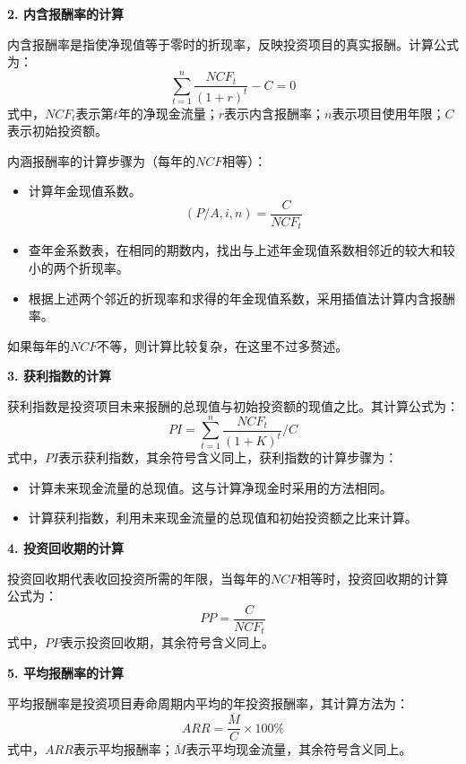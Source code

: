 \documentclass[
  10pt,
  twoside,
  openany,
  b5paper, %
  colorscheme = black, %
  xits = false,
]{qyxf-book}
\begin{document}
\textbf{2. 内含报酬率的计算}

内含报酬率是指使净现值等于零时的折现率，反映投资项目的真实报酬。计算公式为：
\begin{equation*}
	\sum_{t=1}^{n} \frac{NCF_t}{(1+r)^t}-C =0
\end{equation*}
式中，$NCF_t$表示第$t$年的净现金流量；$r$表示内含报酬率；$n$表示项目使用年限；$C$表示初始投资额。

内涵报酬率的计算步骤为（每年的$NCF$相等）：
\begin{itemize}
	\item 计算年金现值系数。
	\begin{equation*}
		(P/A,i,n) = \frac{C}{NCF_t}
	\end{equation*}
	\item 查年金系数表，在相同的期数内，找出与上述年金现值系数相邻近的较大和较小的两个折现率。
	\item 根据上述两个邻近的折现率和求得的年金现值系数，采用插值法计算内含报酬率。
\end{itemize}

如果每年的$NCF$不等，则计算比较复杂，在这里不过多赘述。

\textbf{3. 获利指数的计算}

获利指数是投资项目未来报酬的总现值与初始投资额的现值之比。其计算公式为：
\begin{equation*}
	PI = \sum_{t=1}^{n}\frac{NCF_t}{(1+K)^t}/C
\end{equation*}
式中，$PI$表示获利指数，其余符号含义同上，获利指数的计算步骤为：
\begin{itemize}
	\item 计算未来现金流量的总现值。这与计算净现金时采用的方法相同。
	\item 计算获利指数，利用未来现金流量的总现值和初始投资额之比来计算。
\end{itemize}

\textbf{4. 投资回收期的计算}

投资回收期代表收回投资所需的年限，当每年的$NCF$相等时，投资回收期的计算公式为：
\begin{equation*}
	PP = \frac{C}{NCF_t}
\end{equation*}
式中，$PP$表示投资回收期，其余符号含义同上。

\textbf{5. 平均报酬率的计算}

平均报酬率是投资项目寿命周期内平均的年投资报酬率，其计算方法为：
\begin{equation*}
	ARR = \frac{\overline{M}}{C} \times 100\%
\end{equation*}
式中，$ARR$表示平均报酬率；$\overline{M}$表示平均现金流量，其余符号含义同上。
\end{document}
